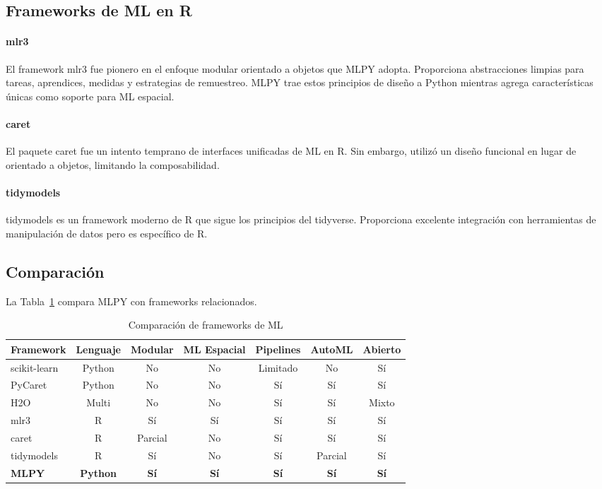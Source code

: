\documentclass[twoside,11pt]{article}
\begin{document}
\subsection{Frameworks de ML en R}

\paragraph{mlr3}
El framework mlr3 \citep{lang2019mlr3} fue pionero en el enfoque modular orientado a objetos que MLPY adopta. Proporciona abstracciones limpias para tareas, aprendices, medidas y estrategias de remuestreo. MLPY trae estos principios de diseño a Python mientras agrega características únicas como soporte para ML espacial.

\paragraph{caret}
El paquete caret \citep{kuhn2008caret} fue un intento temprano de interfaces unificadas de ML en R. Sin embargo, utilizó un diseño funcional en lugar de orientado a objetos, limitando la composabilidad.

\paragraph{tidymodels}
tidymodels \citep{tidymodels} es un framework moderno de R que sigue los principios del tidyverse. Proporciona excelente integración con herramientas de manipulación de datos pero es específico de R.

\subsection{Comparación}

La Tabla~\ref{tab:comparison} compara MLPY con frameworks relacionados.

\begin{table}[h]
\centering
\caption{Comparación de frameworks de ML}
\label{tab:comparison}
\begin{tabular}{lcccccc}
\toprule
Framework & Lenguaje & Modular & ML Espacial & Pipelines & AutoML & Abierto \\
\midrule
scikit-learn & Python & No & No & Limitado & No & Sí \\
PyCaret & Python & No & No & Sí & Sí & Sí \\
H2O & Multi & No & No & Sí & Sí & Mixto \\
mlr3 & R & Sí & Sí & Sí & Sí & Sí \\
caret & R & Parcial & No & Sí & Sí & Sí \\
tidymodels & R & Sí & No & Sí & Parcial & Sí \\
\midrule
\textbf{MLPY} & \textbf{Python} & \textbf{Sí} & \textbf{Sí} & \textbf{Sí} & \textbf{Sí} & \textbf{Sí} \\
\bottomrule
\end{tabular}
\end{table}
\end{document}

